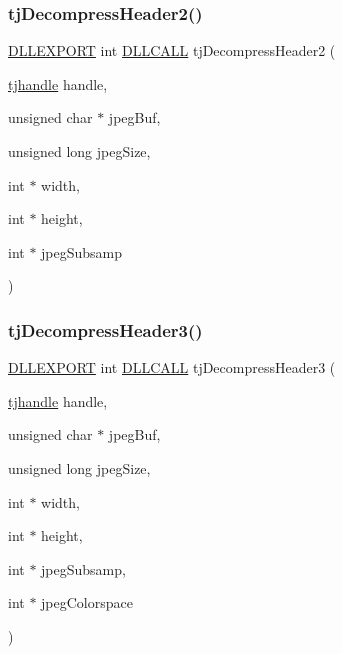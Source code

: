 \subsubsection{\texorpdfstring{tj\+Decompress\+Header2()}{tjDecompressHeader2()}}
{\footnotesize\ttfamily \hyperlink{turbojpeg_8h_a808e08638be3cba36e36759e5b150de0}{D\+L\+L\+E\+X\+P\+O\+RT} int \hyperlink{turbojpeg_8h_a54b25836118bfac94a53a7b790f3ccb2}{D\+L\+L\+C\+A\+LL} tj\+Decompress\+Header2 (\begin{DoxyParamCaption}\item[{\hyperlink{group___turbo_j_p_e_g_ga758d2634ecb4949de7815cba621f5763}{tjhandle}}]{handle,  }\item[{unsigned char $\ast$}]{jpeg\+Buf,  }\item[{unsigned long}]{jpeg\+Size,  }\item[{int $\ast$}]{width,  }\item[{int $\ast$}]{height,  }\item[{int $\ast$}]{jpeg\+Subsamp }\end{DoxyParamCaption})}

\mbox{\label{group___turbo_j_p_e_g_gacd0fac3af74b3511d39b4781b7103086}} 
\subsubsection{\texorpdfstring{tj\+Decompress\+Header3()}{tjDecompressHeader3()}}
{\footnotesize\ttfamily \hyperlink{turbojpeg_8h_a808e08638be3cba36e36759e5b150de0}{D\+L\+L\+E\+X\+P\+O\+RT} int \hyperlink{turbojpeg_8h_a54b25836118bfac94a53a7b790f3ccb2}{D\+L\+L\+C\+A\+LL} tj\+Decompress\+Header3 (\begin{DoxyParamCaption}\item[{\hyperlink{group___turbo_j_p_e_g_ga758d2634ecb4949de7815cba621f5763}{tjhandle}}]{handle,  }\item[{unsigned char $\ast$}]{jpeg\+Buf,  }\item[{unsigned long}]{jpeg\+Size,  }\item[{int $\ast$}]{width,  }\item[{int $\ast$}]{height,  }\item[{int $\ast$}]{jpeg\+Subsamp,  }\item[{int $\ast$}]{jpeg\+Colorspace }\end{DoxyParamCaption})}

